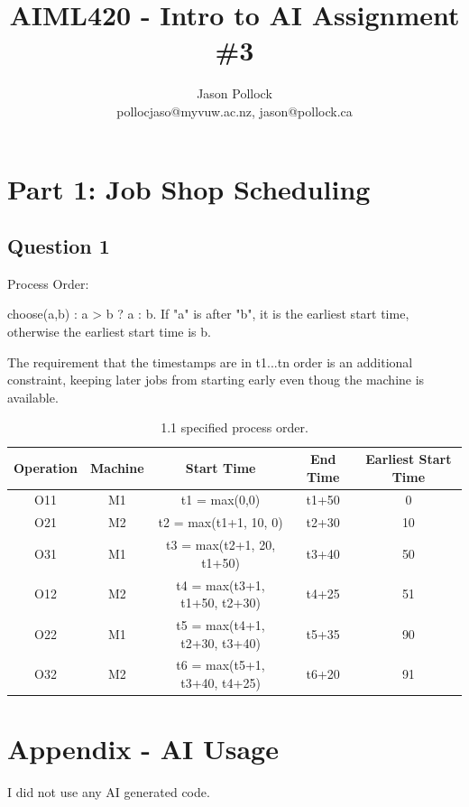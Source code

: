 \documentclass[11pt]{article}
\begin{document}
	\title{AIML420 - Intro to AI  Assignment \#3}	
	\author{Jason Pollock \\ pollocjaso@myvuw.ac.nz, jason@pollock.ca}
	\maketitle
	
	\pagebreak
\section{Part 1: Job Shop Scheduling}

\subsection{Question 1}

Process Order:

choose(a,b) : a > b ? a : b. If "a" is after "b", it is the earliest start time, otherwise the earliest start time is b.

The requirement that the timestamps are in t1...tn order is an additional constraint, keeping later jobs from starting early even thoug the machine is available.

\begin{table}[H]
	\centering
	\begin{tabular}{ | c | c | c | c | c | }
	\hline
	\textbf{Operation} & \textbf{Machine} & \textbf{Start Time} & \textbf{End Time} & \textbf{Earliest Start Time} \\
	\hline
	O11 & M1 & t1 = max(0,0) & t1+50  & 0 \\
	\hline
	O21 & M2 & t2 = max(t1+1, 10, 0) & t2+30 & 10 \\
	\hline
	O31 & M1 & t3 = max(t2+1, 20, t1+50) & t3+40 & 50 \\
	\hline
	O12 & M2 & t4 = max(t3+1, t1+50, t2+30) & t4+25 & 51 \\
	\hline
	O22 & M1 & t5 = max(t4+1, t2+30, t3+40) & t5+35 & 90 \\
	\hline
	O32 & M2 & t6 = max(t5+1, t3+40, t4+25) & t6+20 & 91 \\
	\hline	
	\end{tabular}
\caption{1.1 specified process order.}
\end{table}


\section{Appendix - AI Usage}

I did not use any AI generated code.
\end{document}
